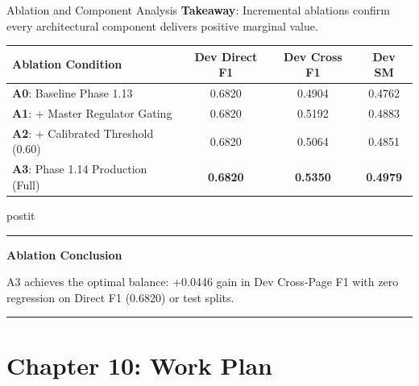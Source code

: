 \documentclass[aspectratio=43,10pt]{beamer}
\newcommand{\card}[4][\linewidth]{%
  \begin{beamercolorbox}[wd=#1,sep=0pt,rounded=false,shadow=false]{postit}%
    {\color{#3}\rule{\linewidth}{1.5pt}}\par
    \colorbox{slatebg}{%
      \begin{minipage}{\dimexpr#1-8pt\relax}%
        \vspace{1.5pt}%
        {\footnotesize\bfseries\color{#3}#2}\vspace{1.5pt}\par%
        {\scriptsize\color{darktext}#4}%
        \vspace{1.5pt}%
      \end{minipage}%
    }%
    \par{\color{bordergray}\rule{\linewidth}{0.6pt}}%
  \end{beamercolorbox}%
}
\begin{document}
\begin{frame}{Ablation and Component Analysis}
  \textbf{Takeaway}: Incremental ablations confirm every architectural component delivers positive marginal value.
  \vspace{0.15cm}
  \begin{center}
    \small
    \renewcommand{\arraystretch}{1.15}
    \begin{tabularx}{\linewidth}{Xccc}
      \toprule
      \textbf{\color{navy}Ablation Condition} & \textbf{\color{navy}Dev Direct F1} & \textbf{\color{navy}Dev Cross F1} & \textbf{\color{navy}Dev SM} \\
      \midrule
      \textbf{A0}: Baseline Phase 1.13 & 0.6820 & 0.4904 & 0.4762 \\
      \textbf{A1}: + Master Regulator Gating & 0.6820 & 0.5192 & 0.4883 \\
      \textbf{A2}: + Calibrated Threshold (0.60) & 0.6820 & 0.5064 & 0.4851 \\
      \midrule
      \textbf{A3}: Phase 1.14 Production (Full) & \textbf{0.6820} & \textbf{0.5350} & \textbf{0.4979} \\
      \bottomrule
    \end{tabularx}
  \end{center}
  \vspace{0.15cm}
  \card{Ablation Conclusion}{teal}{
    A3 achieves the optimal balance: +0.0446 gain in Dev Cross-Page F1 with zero regression on Direct F1 (0.6820) or test splits.
  }
\end{frame}

\section{Chapter 10: Work Plan}
\end{document}
